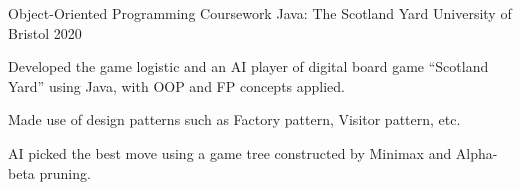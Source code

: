 \begin{cventries}
  \cventry
    {Object-Oriented Programming Coursework} %
    {Java: The Scotland Yard} %
    {University of Bristol} %
    {2020} %
    {
      \begin{cvitems} %
        \item {Developed the game logistic and an AI player of digital board game “Scotland Yard” using Java, with OOP and FP concepts applied.}
        \item {Made use of design patterns such as Factory pattern, Visitor pattern, etc.}
        \item {AI picked the best move using a game tree constructed by Minimax and Alpha-beta pruning.}
      \end{cvitems}
    }



\end{cventries}
